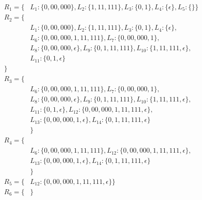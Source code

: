 \begin{equation*}
	\begin{split}
	R_{1} = \{&L_{1}:\{0,00,000\},L_{2}:\{1,11,111\},L_{3}:\{0,1\},L_{4}:\{\epsilon\},L_{5}:\{\}\}\\
		R_{2} = \{&\\
		&L_{1}:\{0,00,000\},L_{2}:\{1,11,111\},L_{3}:\{0,1\},L_{4}:\{\epsilon\},\\
		&L_{6}:\{0,00,000,1,11,111\}, L_{7}:\{0,00,000,1\},\\
		&L_{8}:\{0,00,000,\epsilon\}, L_{9}:\{0, 1, 11,111\}, L_{10}:\{1, 11,111,\epsilon\},\\
		&L_{11}:\{0,1,\epsilon\}\\
		\}&\\
		R_{3} = \{&\\
		&L_{6}:\{0,00,000,1,11,111\}, L_{7}:\{0,00,000,1\},\\
		&L_{8}:\{0,00,000,\epsilon\}, L_{9}:\{0, 1, 11,111\}, L_{10}:\{1, 11,111,\epsilon\},\\ &L_{11}:\{0,1,\epsilon\},L_{12}:\{0,00,000,1,11,111,\epsilon\},\\
		&L_{13}:\{0,00,000,1,\epsilon\},L_{14}:\{0,1,11,111,\epsilon\}\\
		&\}\\
		R_{4} =\{&\\
		&L_{6}:\{0,00,000,1,11,111\},L_{12}:\{0,00,000,1,11,111,\epsilon\},\\
	&L_{13}:\{0,00,000,1,\epsilon\},L_{14}:\{0,1,11,111,\epsilon\}\\
	&\}\\
	R_{5} = \{&L_{12}:\{0,00,000,1,11,111,\epsilon\}\}	\\
	R_{6} = \{&\}
	\end{split}
\end{equation*}